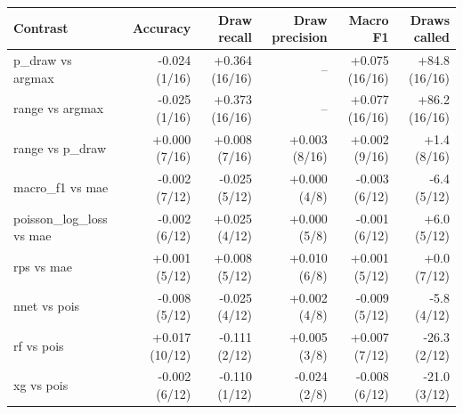 
\begin{tabular}{lrrrrr}
\toprule
Contrast & Accuracy & Draw recall & Draw precision & Macro F1 & Draws called\\
\midrule
p\_draw vs argmax & -0.024 (1/16) & +0.364 (16/16) & -- & +0.075 (16/16) & +84.8 (16/16)\\
range vs argmax & -0.025 (1/16) & +0.373 (16/16) & -- & +0.077 (16/16) & +86.2 (16/16)\\
range vs p\_draw & +0.000 (7/16) & +0.008 (7/16) & +0.003 (8/16) & +0.002 (9/16) & +1.4 (8/16)\\
macro\_f1 vs mae & -0.002 (7/12) & -0.025 (5/12) & +0.000 (4/8) & -0.003 (6/12) & -6.4 (5/12)\\
poisson\_log\_loss vs mae & -0.002 (6/12) & +0.025 (4/12) & +0.000 (5/8) & -0.001 (6/12) & +6.0 (5/12)\\
rps vs mae & +0.001 (5/12) & +0.008 (5/12) & +0.010 (6/8) & +0.001 (5/12) & +0.0 (7/12)\\
nnet vs pois & -0.008 (5/12) & -0.025 (4/12) & +0.002 (4/8) & -0.009 (5/12) & -5.8 (4/12)\\
rf vs pois & +0.017 (10/12) & -0.111 (2/12) & +0.005 (3/8) & +0.007 (7/12) & -26.3 (2/12)\\
xg vs pois & -0.002 (6/12) & -0.110 (1/12) & -0.024 (2/8) & -0.008 (6/12) & -21.0 (3/12)\\
\bottomrule
\end{tabular}
